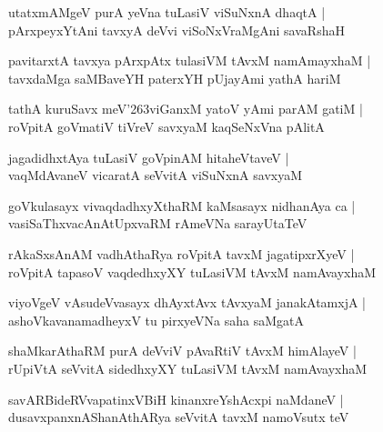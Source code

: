 \documentclass[twoside,12pt,openright]{book}
\def\S{\char'263}
\newcounter{shloka}[chapter]
\begin{document}
\begin{shloka}%
utatxmAMgeV purA yeVna tuLasiV viSuNxnA dhaqtA |\\
pArxpeyxYtAni tavxyA deVvi viSoNxVraMgAni savaRshaH 
\end{shloka}

\begin{shloka}%
pavitarxtA tavxya pArxpAtx tulasiVM tAvxM namAmayxhaM |\\
tavxdaMga saMBaveYH paterxYH pUjayAmi yathA hariM 
\end{shloka}

\begin{shloka}%
tathA kuruSavx meV\S viGanxM yatoV yAmi parAM gatiM |\\
roVpitA goVmatiV tiVreV savxyaM kaqSeNxVna pAlitA
\end{shloka}

\begin{shloka}%
jagadidhxtAya tuLasiV goVpinAM hitaheVtaveV |\\
vaqMdAvaneV vicaratA seVvitA viSuNxnA savxyaM 
\end{shloka}

\begin{shloka}%
goVkulasayx vivaqdadhxyXthaRM kaMsasayx nidhanAya ca |\\
vasiSaThxvacAnAtUpxvaRM rAmeVNa sarayUtaTeV 
\end{shloka}

\begin{shloka}%
rAkaSxsAnAM vadhAthaRya roVpitA tavxM jagatipxrXyeV |\\
roVpitA tapasoV vaqdedhxyXY tuLasiVM tAvxM namAvayxhaM
\end{shloka}

\begin{shloka}%
viyoVgeV vAsudeVvasayx dhAyxtAvx tAvxyaM janakAtamxjA |\\
ashoVkavanamadheyxV tu pirxyeVNa saha saMgatA 
\end{shloka}

\begin{shloka}%
shaMkarAthaRM purA deVviV pAvaRtiV tAvxM himAlayeV |\\
rUpiVtA seVvitA sidedhxyXY tuLasiVM tAvxM namAvayxhaM 
\end{shloka}

\begin{shloka}%
savARBideRVvapatinxVBiH kinanxreYshAcxpi naMdaneV |\\
dusavxpanxnAShanAthARya seVvitA tavxM namoVsutx teV 
\end{shloka}
\end{document}
